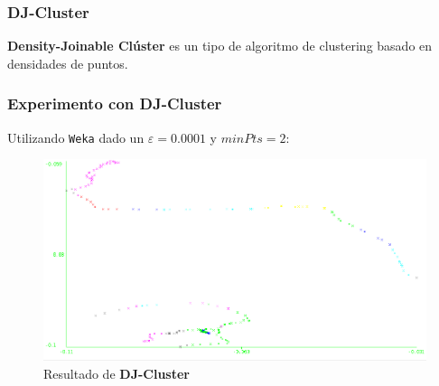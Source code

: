 \documentclass[10pt, spanish]{beamer}
\begin{document}
\begin{frame}[fragile]
\frametitle{DJ-Cluster}
\textbf{Density-Joinable Cl\'uster} es un tipo de algoritmo de clustering basado en densidades de puntos.\\

\bigskip

\begin{algorithmic}[1]
		\Else
		\EndIf
	\EndFor
\end{algorithmic}

\end{frame}

\begin{frame}[fragile]
\frametitle{Experimento con DJ-Cluster}
Utilizando \texttt{Weka} dado un $\varepsilon=0.0001$ y $minPts = 2$:\\

\begin{figure}[H]
	\includegraphics[scale=.43]{djClusterSujeto1.png}
	\caption{Resultado de \textbf{DJ-Cluster}}
\end{figure}

\end{frame}



\end{document}
